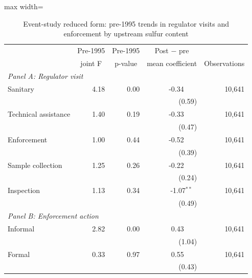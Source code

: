 \begin{table}[htbp]
\raggedright
\begin{minipage}{\linewidth}
\caption{\label{tab:es_rf_pretrend_visenf_k2} Event-study reduced form: pre-1995 trends in regulator visits and enforcement by upstream sulfur content}
\end{minipage}
\small
{\setlength{\tabcolsep}{4pt}%
\begin{adjustbox}{max width=\linewidth}
\begin{tabular}{p{5cm}rrrr}
\toprule
 & \multicolumn{1}{c}{Pre-1995} & \multicolumn{1}{c}{Pre-1995} & \multicolumn{1}{c}{Post $-$ pre} & \\
 & \multicolumn{1}{c}{joint F} & \multicolumn{1}{c}{p-value} & \multicolumn{1}{c}{mean coefficient} & \multicolumn{1}{c}{Observations} \\
\hline
\multicolumn{5}{l}{\textit{Panel A: Regulator visit}} \\
\quad Sanitary & 4.18 & 0.00 & \phantom{(}-0.34$^{\phantom{*}\phantom{*}\phantom{*}}$ & 10,641 \\
 & & & (\phantom{-}0.59)\phantom{$^{***}$} & \\
\quad Technical assistance & 1.40 & 0.19 & \phantom{(}-0.33$^{\phantom{*}\phantom{*}\phantom{*}}$ & 10,641 \\
 & & & (\phantom{-}0.47)\phantom{$^{***}$} & \\
\quad Enforcement & 1.00 & 0.44 & \phantom{(}-0.52$^{\phantom{*}\phantom{*}\phantom{*}}$ & 10,641 \\
 & & & (\phantom{-}0.39)\phantom{$^{***}$} & \\
\quad Sample collection & 1.25 & 0.26 & \phantom{(}-0.22$^{\phantom{*}\phantom{*}\phantom{*}}$ & 10,641 \\
 & & & (\phantom{-}0.24)\phantom{$^{***}$} & \\
\quad Inspection & 1.13 & 0.34 & \phantom{(}-1.07$^{**\phantom{*}}$ & 10,641 \\
 & & & (\phantom{-}0.49)\phantom{$^{***}$} & \\
\hline
\multicolumn{5}{l}{\textit{Panel B: Enforcement action}} \\
\quad Informal & 2.82 & 0.00 & \phantom{(}\phantom{-}0.43$^{\phantom{*}\phantom{*}\phantom{*}}$ & 10,641 \\
 & & & (\phantom{-}1.04)\phantom{$^{***}$} & \\
\quad Formal & 0.33 & 0.97 & \phantom{(}\phantom{-}0.55$^{\phantom{*}\phantom{*}\phantom{*}}$ & 10,641 \\
 & & & (\phantom{-}0.43)\phantom{$^{***}$} & \\

\end{tabular}
\end{adjustbox}}
\end{table}
